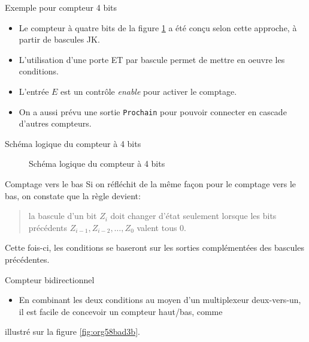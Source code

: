 \documentclass[presentation]{beamer}
\begin{document}
\begin{frame}[label={sec:org4414341},fragile]{Exemple pour compteur 4 bits}
 \begin{itemize}
\item Le compteur à quatre bits de la figure \ref{fig:org1a203ed} a été conçu selon cette approche, à partir de bascules JK.

\item L'utilisation d'une porte ET par bascule permet de mettre en oeuvre les conditions.

\item L'entrée \(E\) est un contrôle \emph{enable} pour activer le comptage.

\item On a aussi prévu une sortie \texttt{Prochain} pour pouvoir connecter en cascade d'autres compteurs.
\end{itemize}
\end{frame}

\begin{frame}[label={sec:org373d106}]{Schéma logique du compteur à 4 bits}
\begin{figure}[htbp]
\centering

\caption{\label{fig:org1a203ed}Schéma logique du compteur à 4 bits}
\end{figure}
\end{frame}

\begin{frame}[label={sec:orgd7302d4}]{Comptage vers le bas}
Si on réfléchit de la même façon pour le comptage vers le bas, on constate
que la règle devient:

\begin{quote}
la bascule d'un bit \(Z_i\) doit changer d'état
seulement lorsque les bits précédents \(Z_{i-1},Z_{i-2},\ldots, Z_0\)
valent tous 0.
\end{quote}

Cette fois-ci, les conditions se baseront sur les sorties
complémentées des bascules précédentes.
\end{frame}

\begin{frame}[label={sec:orgc2dc66e}]{Compteur bidirectionnel}
\begin{itemize}
\item En combinant les deux conditions au moyen d'un multiplexeur deux-vers-un, il est facile de concevoir un compteur haut/bas, comme
\end{itemize}
illustré sur la figure \ref{fig:org58bad3b}.
\end{frame}
\end{document}
